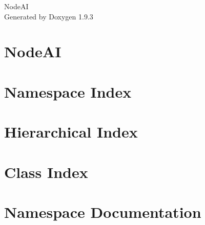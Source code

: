 \documentclass[twoside]{book}
\newcommand{\+}{\discretionary{\mbox{\scriptsize$\hookleftarrow$}}{}{}}
\newcommand{\clearemptydoublepage}{%
    \newpage{\pagestyle{empty}\cleardoublepage}%
  }
\begin{document}
  \raggedbottom
    \hypersetup{pageanchor=false,
                bookmarksnumbered=true,
                pdfencoding=unicode
               }
  \begin{titlepage}
  \vspace*{7cm}
  \begin{center}%
  {\Large Node\+AI}\\
  \vspace*{1cm}
  {\large Generated by Doxygen 1.9.3}\\
  \end{center}
  \end{titlepage}
  \clearemptydoublepage
  \tableofcontents
  \clearemptydoublepage
  \hypersetup{pageanchor=true}
\chapter{Node\+AI}
\label{index}\hypertarget{index}{}
\chapter{Namespace Index}

\chapter{Hierarchical Index}

\chapter{Class Index}

\chapter{Namespace Documentation}








\end{document}
